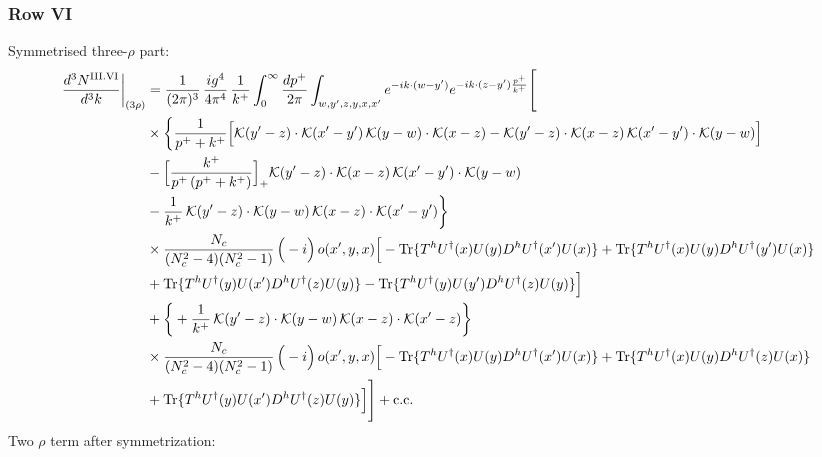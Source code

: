\documentclass[9pt]{article}
\numberwithin{equation}{section}
\begin{document}
\subsubsection*{Row VI}
Symmetrised three-$\rho$ part:
\begin{align}
\frac{d^{3}N^{\rm III.VI}}{d^{3}k}\bigg|_{(3\rho)}&=\frac{1}{(2\pi)^{3}}\,\frac{ig^{4}}{4\pi^{4}}\,\frac{1}{k^{+}}\int_{0}^{\infty}\frac{dp^{+}}{2\pi}\int_{w,y',z,y,x,x'}e^{-ik\cdot(w-y')}e^{-ik\cdot(z-y')\frac{p^{+}}{k^{+}}}\Bigg[\notag\\
&\times\bigg\{\frac{1}{p^{+}+k^{+}}\Big[\mathcal{K}(y'-z)\cdot\mathcal{K}(x'-y')\,\mathcal{K}(y-w)\cdot\mathcal{K}(x-z)-\mathcal{K}(y'-z)\cdot\mathcal{K}(x-z)\,\mathcal{K}(x'-y')\cdot\mathcal{K}(y-w)\Big]\notag\\
&-\Big[\frac{k^{+}}{p^{+}\,(p^{+}+k^{+})}\Big]_{+}\mathcal{K}(y'-z)\cdot\mathcal{K}(x-z)\,\mathcal{K}(x'-y')\cdot\mathcal{K}(y-w)\notag\\
&-\frac{1}{k^{+}}\,\mathcal{K}(y'-z)\cdot\mathcal{K}(y-w)\,\mathcal{K}(x-z)\cdot\mathcal{K}(x'-y')\bigg\}\notag\\
&\times \frac{N_{c}}{(N_{c}^{2}-4)(N_{c}^{2}-1)}\,\Big(-i\Big)\,o(x',y,x)\Big[-{\rm Tr}\{T^{h}U^{\dagger}(x)U(y)D^{h}U^{\dagger}(x')U(x)\}+{\rm Tr}\{T^{h}U^{\dagger}(x)U(y)D^{h}U^{\dagger}(y')U(x)\}\notag\\
& +{\rm Tr}\{T^{h}U^{\dagger}(y)U(x')D^{h}U^{\dagger}(z)U(y)\}-{\rm Tr}\{T^{h}U^{\dagger}(y)U(y')D^{h}U^{\dagger}(z)U(y)\}\Big]\notag\\
&+\bigg\{+\frac{1}{k^{+}}\,\mathcal{K}(y'-z)\cdot\mathcal{K}(y-w)\,\mathcal{K}(x-z)\cdot\mathcal{K}(x'-z)\bigg\}\notag\\
&\times \frac{N_{c}}{(N_{c}^{2}-4)(N_{c}^{2}-1)}\,\Big(-i\Big)\,o(x',y,x)\Big[-{\rm Tr}\{T^{h}U^{\dagger}(x)U(y)D^{h}U^{\dagger}(x')U(x)\}+{\rm Tr}\{T^{h}U^{\dagger}(x)U(y)D^{h}U^{\dagger}(z)U(x)\}\notag\\
& +{\rm Tr}\{T^{h}U^{\dagger}(y)U(x')D^{h}U^{\dagger}(z)U(y)\}\Big]\Bigg]+{\rm c.c.}\label{eq:E-III.VI-3}
\end{align}
Two $\rho$ term after symmetrization: 
\end{document}
